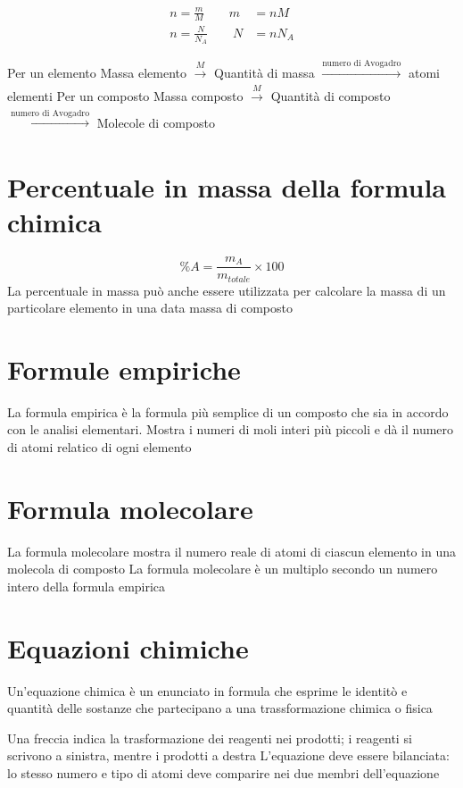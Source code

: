 \documentclass[a4paper,11pt]{report}
\begin{document}
\begin{align*}
	n = \frac{m}{M} \qquad  m &= nM \\
	n = \frac{N}{N_A} \qquad  N &= nN_A
\end{align*}

\noindent Per un elemento \qquad  Massa elemento $\xrightarrow[]{M}$ Quantità di massa $\xrightarrow[]{\text{numero di Avogadro}}$ atomi elementi \newline
Per un composto \qquad Massa composto $\xrightarrow[]{M}$ Quantità di composto $\xrightarrow[]{\text{numero di Avogadro}}$ Molecole di composto 

\section{Percentuale in massa della formula chimica}
\[\% A = \frac{m_A}{m_{totale}} \times 100\]
La percentuale in massa può anche essere utilizzata per calcolare la massa di un particolare elemento in una data massa di composto

\section{Formule empiriche}
La formula empirica è la formula più semplice di un composto che sia in accordo con le analisi elementari. Mostra i numeri di moli interi più piccoli e dà il numero di atomi relatico di ogni elemento

\section{Formula molecolare}
La formula molecolare mostra il numero reale di atomi di ciascun elemento in una molecola di composto \newline
La formula molecolare è un multiplo secondo un numero intero della formula empirica 

\section{Equazioni chimiche}
Un'equazione chimica è un enunciato in formula che esprime le identitò e quantità delle sostanze che partecipano a una trassformazione chimica o fisica \newline

Una freccia indica la trasformazione dei reagenti nei prodotti; i reagenti si scrivono a sinistra, mentre i prodotti a destra \newline
L'equazione deve essere bilanciata: lo stesso numero e tipo di atomi deve comparire nei due membri dell'equazione 
\end{document}
